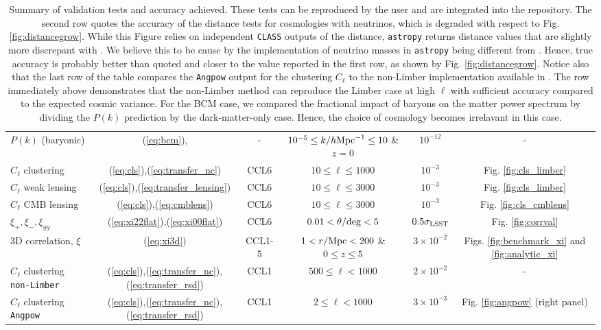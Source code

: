 \begin{sidewaystable*}[!htp]
\begin{tabular}{ l|c c c c c}
    $P(k)$ (baryonic) & (\ref{eq:bcm}), \citet{Schneider15} &  - & $10^{-5}\leq k/h{\rm Mpc}^{-1}\leq 10$ \& $z=0$ & $10^{-12}$ & -\\
    $C_\ell$ clustering & (\ref{eq:cls}),(\ref{eq:transfer_nc})& CCL6 &$10 \leq \ell\leq 1000$ &  $10^{-3}$ & Fig. \ref{fig:cls_limber}\\
    $C_\ell$ weak lensing & (\ref{eq:cls}),(\ref{eq:transfer_lensing})& CCL6 &$10 \leq \ell\leq 3000$ &  $10^{-3}$ & Fig. \ref{fig:cls_limber}\\
    $C_\ell$ CMB lensing &(\ref{eq:cls}),(\ref{eq:cmblens}) & CCL6 & $10 \leq \ell\leq 3000$& $10^{-3}$ & Fig. \ref{fig:cls_cmblens}\\
    $\xi_+,\xi_-,\xi_{gg}$ & (\ref{eq:xi22flat}),(\ref{eq:xi00flat}) & CCL6 & $0.01< \theta/{\rm deg}< 5$&  $0.5\sigma_{\rm LSST}$ & Fig. \ref{fig:corrval}\\
    3D correlation, $\xi$ & (\ref{eq:xi3d}) & CCL1-5 & $1<r/{\rm Mpc}<200$ \& $0 \leq z \leq 5$& $3\times 10^{-2}$ & Figs. \ref{fig:benchmark_xi} and \ref{fig:analytic_xi} \\
    $C_\ell$ clustering {\tt non-Limber} &  (\ref{eq:cls}),(\ref{eq:transfer_nc}),(\ref{eq:transfer_rsd}) & CCL1 & $500 \leq \ell < 1000$ & $2\times 10^{-2}$ & - \\
    $C_\ell$ clustering {\tt Angpow} & (\ref{eq:cls}),(\ref{eq:transfer_nc}),(\ref{eq:transfer_rsd}) & CCL1 & $2 \leq \ell < 1000$ & $3\times 10^{-3}$  & Fig. \ref{fig:angpow} (right panel)\\
    \hline
  \end{tabular}
  \caption{Summary of \ccl validation tests and accuracy achieved. These tests can be reproduced by the user and are integrated into the \ccl repository. The second row quotes the accuracy of the distance tests for cosmologies with neutrinos, which is degraded with respect to Fig. \ref{fig:distancegrow}. While this Figure relies on independent {\tt CLASS} outputs of the distance, {\tt astropy} returns distance values that are slightly more discrepant with \ccl. We believe this to be cause by the implementation of neutrino masses in {\tt astropy} being different from \ccl. Hence, true accuracy is probably better than quoted and closer to the value reported in the first row, as shown by Fig. \ref{fig:distancegrow}. Notice also that the last row of the table compares the {\tt Angpow} output for the clustering $C_\ell$ to the non-Limber implementation available in \ccl. The row immediately above demonstrates that the non-Limber method can reproduce the Limber case at high $\ell$ with sufficient accuracy compared to the expected cosmic variance. For the BCM case, we compared the fractional impact of baryons on the matter power spectrum by dividing the $P(k)$ prediction by the dark-matter-only case. Hence, the choice of cosmology becomes irrelavant in this case.}
  \label{tab:tests}
\end{sidewaystable*}
